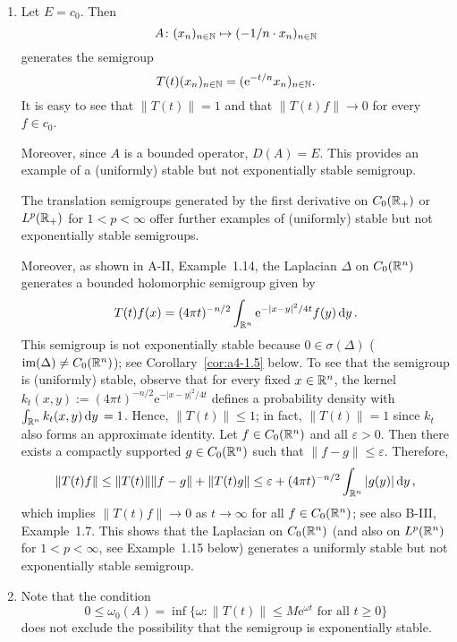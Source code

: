 \begin{example}\label{ex:a4-1.2}
\begin{enumerate}[\upshape (i), wide, labelsep=1em]

\item 
Let $E = c_{0}$. 
Then 
\[
A \colon (x_{n})_{n \in \mathbb{N}} \mapsto (-1/n \cdot x_{n})_{n \in \mathbb{N}}
\] 
generates the semigroup 
\[
T(t)(x_{n})_{n \in \mathbb{N}} = (\mathrm{e}^{-t/n} x_{n})_{n \in \mathbb{N}}.
\]
It is easy to see that $\|T(t)\|=1$ and that $\|T(t)f\|\to 0$ for every $f \in c_{0}$.

Moreover, since $A$ is a bounded operator, $D(A) = E$.
This provides an example of a (uniformly) stable but not exponentially stable semigroup.

The translation semigroups generated by the first derivative on $C_0(\mathbb{R}_{+})$ or $L^{p}(\mathbb{R}_{+})$ for $1 < p < \infty$ offer further examples of (uniformly) stable but not exponentially stable semigroups.

Moreover, as shown in A-II, Example~1.14, the Laplacian $\Delta$ on $C_0(\mathbb{R}^{n})$ generates a bounded holomorphic semigroup given by
\[
T(t)f(x) = (4\pi t)^{-n/2} \int_{\mathbb{R}^{n}} \mathrm{e}^{-|x-y|^{2}/4t} f(y)  \mathop{}\!\mathrm{d}{y}\,.
\]
This semigroup is not exponentially stable because $0 \in \sigma(\Delta)$ ($\textrm{im}(\Delta) \not= C_0(\mathbb{R}^{n})$); see Corollary~\ref{cor:a4-1.5} below. To see that the semigroup is (uniformly) stable, observe that for every fixed $x\in\mathbb{R}^n$, the kernel $k_t(x,y) := (4\pi t)^{-n/2} \mathrm{e}^{-|x-y|^{2}/4t}$ defines a probability density with $\int_{\mathbb{R}^n} k_t(x,y) \mathop{}\!\mathrm{d}{y}\, = 1$. Hence, $\|T(t)\| \le 1$; in fact, $\|T(t)\| = 1$ since $k_t$ also forms an approximate identity. Let $f \in C_0(\mathbb{R}^{n})$ and all $\varepsilon > 0$. Then there exists a compactly supported $g \in C_0(\mathbb{R}^{n})$ such that $\|f-g\| \le \varepsilon$. Therefore,
\[
\|T(t)f\| \le  \|T(t)\|\|f-g\| + \|T(t)g\| \le \varepsilon + (4\pi t)^{-n/2} \int_{\mathbb{R}^{n}} |g(y)|  \mathop{}\!\mathrm{d}{y}\, ,
\]
which implies  $\|T(t)f\| \to 0$ as $t\to\infty$ for all $f \in C_0(\mathbb{R}^{n})$; see also B-III, Example~1.7.
This shows that the Laplacian on $C_0(\mathbb{R}^{n})$ (and also on $L^{p}(\mathbb{R}^{n})$ for $1 < p < \infty$, see Example~1.15 below) generates a uniformly stable but not exponentially stable semigroup.

\item 
Note that the condition 
\[
0 \leq \omega_{0}(A) = \inf\{\omega\colon\|T(t)\| \leq M\mathrm{e}^{\omega t} \text{ for all } t \geq 0\}
\]
does not exclude the possibility that the semigroup is exponentially stable.


\end{enumerate}
\end{example}
